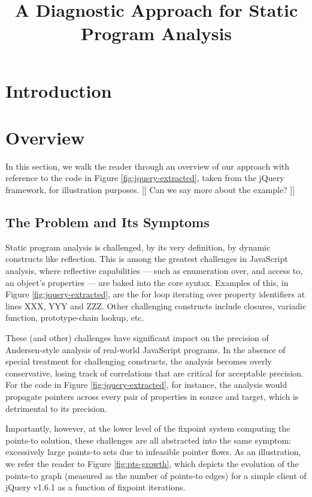 \documentclass[a4paper,UKenglish]{lipics}
\title{A Diagnostic Approach for Static Program Analysis}
\author{}
\begin{document}
\maketitle

\begin{abstract}

 \end{abstract}

\section{Introduction}

\section{Overview}

In this section, we walk the reader through an overview of our approach with reference to the code in Figure \ref{fig:jquery-extracted}, taken from the jQuery framework, for illustration purposes. [[ Can we say more about the example? ]]

\subsection{The Problem and Its Symptoms}

Static program analysis is challenged, by its very definition, by dynamic constructs like reflection. This is among the greatest challenges in JavaScript analysis, where reflective capabilities --- such as enumeration over, and access to, an object's properties --- are baked into the core syntax. Examples of this, in Figure \ref{fig:jquery-extracted}, are the {\sf for} loop iterating over property identifiers at lines XXX, YYY and ZZZ. Other challenging constructs include closures, variadic function, prototype-chain lookup, etc.

These (and other) challenges have significant impact on the precision of Andersen-style analysis of real-world JavaScript programs. In the absence of special treatment for challenging constructs, the analysis becomes overly conservative, losing track of correlations that are critical for acceptable precision. For the code in Figure \ref{fig:jquery-extracted}, for instance, the analysis would propagate pointers across every pair of properties in {\sf source} and {\sf target}, which is detrimental to its precision.

Importantly, however, at the lower level of the fixpoint system computing the points-to solution, these challenges are all abstracted into the same symptom: excessively large points-to sets due to infeasible pointer flows. As an illustration, 
we refer the reader to Figure \ref{fig:pts-growth}, which depicts the evolution of the points-to graph (measured as the number of points-to edges) for a simple client of jQuery v1.6.1 as a function of fixpoint iterations.
\end{document}
